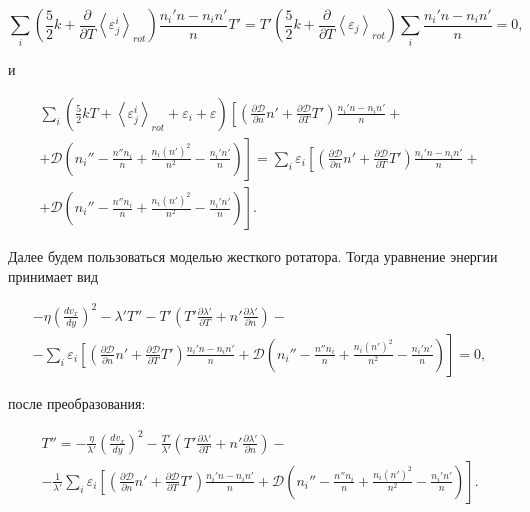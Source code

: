 \documentclass[12pt]{article}
\begin{document}
\begin{equation}
  \sum_{i}\left(\frac{5}{2}k + \frac{\partial}{\partial T}\left<\varepsilon^{i}_{j}\right>_{rot} \right)\frac{n_{i}'n - n_{i}n'}{n}T' = T'\left(\frac{5}{2}k + \frac{\partial}{\partial T}\left<\varepsilon_{j}\right>_{rot} \right) \sum_{i}\frac{n_{i}'n - n_{i}n'}{n} = 0,
\end{equation}

и

\begin{multline}
   \sum_{i} \left(\frac{5}{2}kT + \left<\varepsilon^{i}_{j} \right>_{rot} + \varepsilon_{i} + \varepsilon \right) \left[\left(\frac{\partial \mathcal{D}}{\partial n}n' + \frac{\partial \mathcal{D}}{\partial T}T' \right) \frac{n_{i}'n - n_{i}n'}{n} \right. + \\
  + \left. \mathcal{D}\left(n_{i}'' - \frac{n''n_{i}}{n} + \frac{n_{i}\left(n'\right)^2}{n^2} - \frac{n_{i}'n'}{n} \right)  \right] =  \sum_{i}\varepsilon_{i} \left[\left(\frac{\partial \mathcal{D}}{\partial n}n' + \frac{\partial \mathcal{D}}{\partial T}T' \right) \frac{n_{i}'n - n_{i}n'}{n} \right. + \\
  + \left. \mathcal{D}\left(n_{i}'' - \frac{n''n_{i}}{n} + \frac{n_{i}\left(n'\right)^2}{n^2} - \frac{n_{i}'n'}{n} \right)  \right].
\end{multline}

Далее будем пользоваться моделью жесткого ротатора. Тогда уравнение энергии принимает вид

\begin{multline}
  - \eta \left(\frac{d v_{x}}{d y} \right)^2 -\lambda' T'' - T' \left(T' \frac{\partial \lambda'}{\partial T} + n' \frac{\partial \lambda'}{\partial n} \right) - \\
  - \sum_{i}\varepsilon_{i} \left[\left(\frac{\partial \mathcal{D}}{\partial n}n' + \frac{\partial \mathcal{D}}{\partial T}T' \right) \frac{n_{i}'n - n_{i}n'}{n} \right. + \left. \mathcal{D}\left(n_{i}'' - \frac{n''n_{i}}{n} + \frac{n_{i}\left(n'\right)^2}{n^2} - \frac{n_{i}'n'}{n} \right)  \right] = 0,
\end{multline}

после преобразования:

\begin{multline}
  T'' = -\frac{\eta}{\lambda'} \left(\frac{d v_{x}}{d y} \right)^2 - \frac{T'}{\lambda'} \left(T' \frac{\partial \lambda'}{\partial T} + n' \frac{\partial \lambda'}{\partial n} \right) - \\
  - \frac{1}{\lambda'}\sum_{i}\varepsilon_{i} \left[\left(\frac{\partial \mathcal{D}}{\partial n}n' + \frac{\partial \mathcal{D}}{\partial T}T' \right) \frac{n_{i}'n - n_{i}n'}{n} \right. + \left. \mathcal{D}\left(n_{i}'' - \frac{n''n_{i}}{n} + \frac{n_{i}\left(n'\right)^2}{n^2} - \frac{n_{i}'n'}{n} \right)  \right].
\end{multline}
\end{document}
